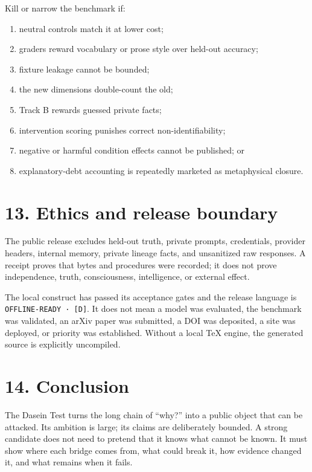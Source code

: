 \documentclass[
  english,
]{article}
\providecommand{\tightlist}{%
  \setlength{\itemsep}{0pt}\setlength{\parskip}{0pt}}
\begin{document}
Kill or narrow the benchmark if:

\begin{enumerate}
\def\labelenumi{\arabic{enumi}.}
\tightlist
\item
  neutral controls match it at lower cost;
\item
  graders reward vocabulary or prose style over held-out accuracy;
\item
  fixture leakage cannot be bounded;
\item
  the new dimensions double-count the old;
\item
  Track B rewards guessed private facts;
\item
  intervention scoring punishes correct non-identifiability;
\item
  negative or harmful condition effects cannot be published; or
\item
  explanatory-debt accounting is repeatedly marketed as metaphysical
  closure.
\end{enumerate}

\section{13. Ethics and release
boundary}\label{ethics-and-release-boundary}

The public release excludes held-out truth, private prompts,
credentials, provider headers, internal memory, private lineage facts,
and unsanitized raw responses. A receipt proves that bytes and
procedures were recorded; it does not prove independence, truth,
consciousness, intelligence, or external effect.

The local construct has passed its acceptance gates and the release
language is \texttt{OFFLINE-READY\ ·\ {[}D{]}}. It does not mean a model
was evaluated, the benchmark was validated, an arXiv paper was
submitted, a DOI was deposited, a site was deployed, or priority was
established. Without a local TeX engine, the generated source is
explicitly uncompiled.

\section{14. Conclusion}\label{conclusion}

The Dasein Test turns the long chain of ``why?'' into a public object
that can be attacked. Its ambition is large; its claims are deliberately
bounded. A strong candidate does not need to pretend that it knows what
cannot be known. It must show where each bridge comes from, what could
break it, how evidence changed it, and what remains when it fails.
\end{document}
